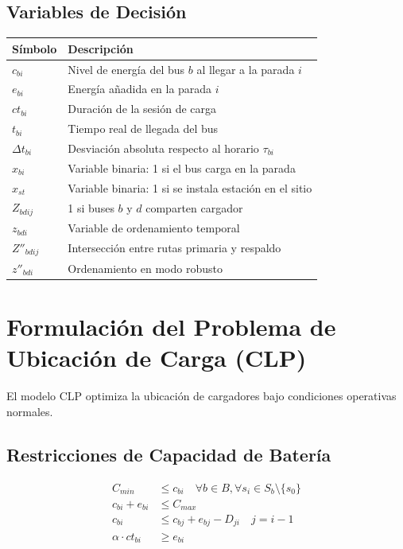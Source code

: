 \documentclass[12pt]{article}
\begin{document}
\subsection{Variables de Decisión}

\begin{longtable}{ll}
\toprule
Símbolo & Descripción \\
\midrule
$c_{bi}$ & Nivel de energía del bus $b$ al llegar a la parada $i$ \\
$e_{bi}$ & Energía añadida en la parada $i$ \\
$ct_{bi}$ & Duración de la sesión de carga \\
$t_{bi}$ & Tiempo real de llegada del bus \\
$\Delta t_{bi}$ & Desviación absoluta respecto al horario $\tau_{bi}$ \\
$x_{bi}$ & Variable binaria: 1 si el bus carga en la parada \\
$x_{st}$ & Variable binaria: 1 si se instala estación en el sitio \\
$Z_{bdij}$ & 1 si buses $b$ y $d$ comparten cargador \\
$z_{bdi}$ & Variable de ordenamiento temporal \\
$Z''_{bdij}$ & Intersección entre rutas primaria y respaldo \\
$z''_{bdi}$ & Ordenamiento en modo robusto \\
\bottomrule
\end{longtable}

\section{Formulación del Problema de Ubicación de Carga (CLP)}

El modelo CLP optimiza la ubicación de cargadores bajo condiciones operativas normales.

\subsection{Restricciones de Capacidad de Batería}

\begin{align}
C_{min} &\leq c_{bi} \quad \forall b \in B, \forall s_i \in S_b \setminus \{s_0\} \tag{1} \\
c_{bi} + e_{bi} &\leq C_{max} \tag{2} \\
c_{bi} &\leq c_{bj} + e_{bj} - D_{ji} \quad j=i-1 \tag{3} \\
\alpha \cdot ct_{bi} &\geq e_{bi} \tag{4}
\end{align}
\end{document}
